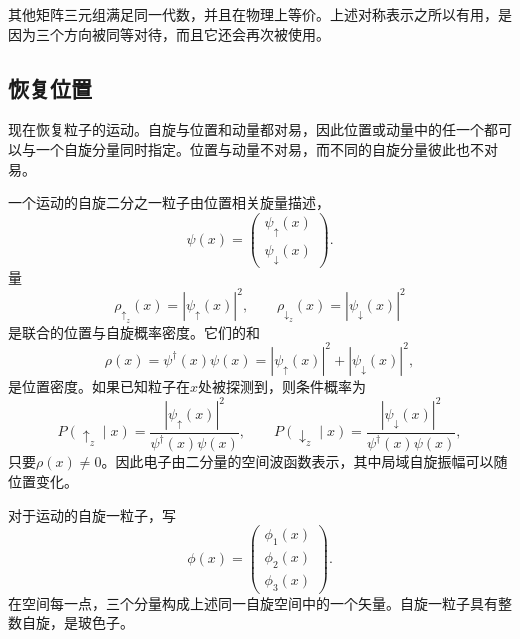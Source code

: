 其他矩阵三元组满足同一代数，并且在物理上等价。上述对称表示之所以有用，是因为三个方向被同等对待，而且它还会再次被使用。

\subsection{恢复位置}

现在恢复粒子的运动。自旋与位置和动量都对易，因此位置或动量中的任一个都可以与一个自旋分量同时指定。位置与动量不对易，而不同的自旋分量彼此也不对易。

一个运动的自旋二分之一粒子由位置相关旋量描述，
\begin{equation}
\psi(x)=
\begin{pmatrix}
\psi_\uparrow(x)\\
\psi_\downarrow(x)
\end{pmatrix}.
\end{equation}
量
\begin{equation}
\rho_{\uparrow_z}(x)=|\psi_\uparrow(x)|^2,
\qquad
\rho_{\downarrow_z}(x)=|\psi_\downarrow(x)|^2
\end{equation}
是联合的位置与自旋概率密度。它们的和
\begin{equation}
\rho(x)=\psi^\dagger(x)\psi(x)
=|\psi_\uparrow(x)|^2+|\psi_\downarrow(x)|^2,
\end{equation}
是位置密度。如果已知粒子在\(x\)处被探测到，则条件概率为
\begin{equation}
P(\uparrow_z\mid x)
=
\frac{|\psi_\uparrow(x)|^2}{\psi^\dagger(x)\psi(x)},
\qquad
P(\downarrow_z\mid x)
=
\frac{|\psi_\downarrow(x)|^2}{\psi^\dagger(x)\psi(x)},
\end{equation}
只要\(\rho(x)\neq0\)。因此电子由二分量的空间波函数表示，其中局域自旋振幅可以随位置变化。

对于运动的自旋一粒子，写
\begin{equation}
\phi(x)=
\begin{pmatrix}
\phi_1(x)\\
\phi_2(x)\\
\phi_3(x)
\end{pmatrix}.
\end{equation}
在空间每一点，三个分量构成上述同一自旋空间中的一个矢量。自旋一粒子具有整数自旋，是玻色子。

\begin{classroomqa}
\end{classroomqa}

